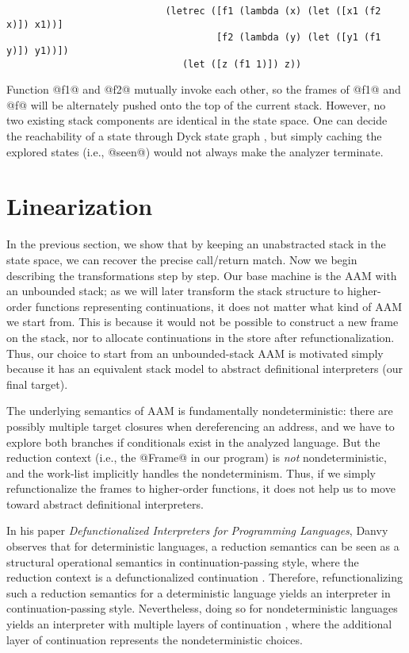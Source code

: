\documentclass[acmsmall, screen]{acmart}\settopmatter{}
\begin{document}
\begin{lstlisting}
                            (letrec ([f1 (lambda (x) (let ([x1 (f2 x)]) x1))]
                                     [f2 (lambda (y) (let ([y1 (f1 y)]) y1))])
                               (let ([z (f1 1)]) z))
\end{lstlisting}

Function @f1@ and @f2@ mutually invoke each other, so the frames of @f1@ and @f@ will be
alternately pushed onto the top of the current stack. However, no two existing stack
components are identical in the state space. One can decide the reachability of a state
through Dyck state graph \cite{earl2010pushdown, earl2012introspective}, but simply
caching the explored states (i.e., @seen@) would not always make the analyzer terminate.


\section{Linearization} \label{linear}

In the previous section, we show that by keeping an unabstracted stack in the state
space, we can recover the precise call/return match. Now we begin describing the
transformations step by step. Our base machine is the AAM with an unbounded
stack; as we will later transform the stack structure to higher-order functions
representing continuations, it does not matter what kind of AAM we start from.
This is because it would not be possible to construct a new frame on the stack, nor
to allocate continuations in the store after refunctionalization.
Thus, our choice to start from an unbounded-stack AAM is motivated simply because
it has an equivalent stack model to abstract definitional interpreters (our final target).

The underlying semantics of AAM is fundamentally nondeterministic: there are possibly
multiple target closures when dereferencing an address, and we have to explore both branches
if conditionals exist in the analyzed language. But the reduction context (i.e., the @Frame@ in
our program) is \emph{not} nondeterministic, and the work-list implicitly
handles the nondeterminism. Thus, if we simply refunctionalize the frames to higher-order
functions, it does not help us to move toward abstract definitional interpreters.

In his paper \textit{Defunctionalized Interpreters for Programming Languages},
Danvy observes that for deterministic languages, a reduction semantics can be seen as
a structural operational semantics in continuation-passing style, where the reduction context is
a defunctionalized continuation \cite{Danvy:2008:DIP:1411204.1411206}. Therefore,
refunctionalizing such a reduction semantics for a deterministic language yields
an interpreter in continuation-passing style.
Nevertheless, doing so for nondeterministic languages yields an interpreter
with multiple layers of continuation \cite{Danvy:2006:RW:2171265.2171268, DANVY2009534},
where the additional layer of continuation represents the nondeterministic choices.
\end{document}
